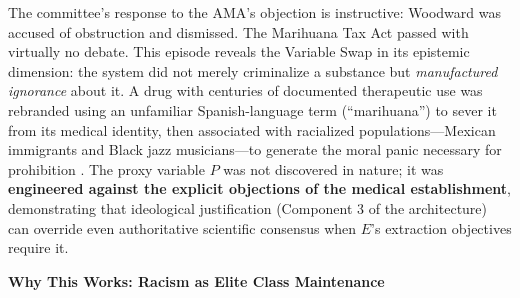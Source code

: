 \documentclass[12pt,openany]{book}
\begin{document}
The committee's response to the AMA's objection is instructive: Woodward was accused of obstruction and dismissed. The Marihuana Tax Act passed with virtually no debate. This episode reveals the Variable Swap in its epistemic dimension: the system did not merely criminalize a substance but \textit{manufactured ignorance} about it. A drug with centuries of documented therapeutic use was rebranded using an unfamiliar Spanish-language term (``marihuana'') to sever it from its medical identity, then associated with racialized populations---Mexican immigrants and Black jazz musicians---to generate the moral panic necessary for prohibition \cite{bonnie}. The proxy variable $P$ was not discovered in nature; it was \textbf{engineered against the explicit objections of the medical establishment}, demonstrating that ideological justification (Component 3 of the architecture) can override even authoritative scientific consensus when $E$'s extraction objectives require it.

\textbf{Why This Works: Racism as Elite Class Maintenance}
\end{document}
